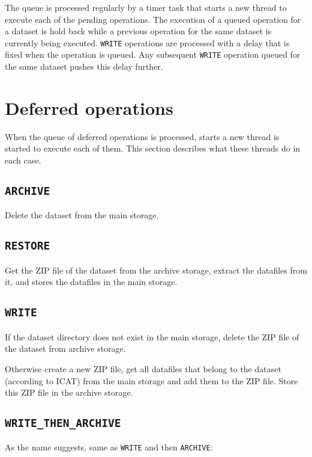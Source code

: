 \documentclass[paper=a4]{scrartcl}
\begin{document}
The queue is processed regularly by a timer task that starts a new
thread to execute each of the pending operations.  The execution of a
queued operation for a dataset is hold back while a previous operation
for the same dataset is currently being executed.  \texttt{WRITE}
operations are processed with a delay that is fixed when the operation
is queued.  Any subsequent \texttt{WRITE} operation queued for the
same dataset pushes this delay further.


\section{Deferred operations}
\label{sec:defops}

When the queue of deferred operations is processed, starts a new
thread is started to execute each of them.  This section describes
what these threads do in each case.

\subsection{\texttt{ARCHIVE}}

Delete the dataset from the main storage.

\subsection{\texttt{RESTORE}}

Get the ZIP file of the dataset from the archive storage, extract the
datafiles from it, and stores the datafiles in the main storage.

\subsection{\texttt{WRITE}}

If the dataset directory does not exist in the main storage, delete
the ZIP file of the dataset from archive storage.

Otherwise create a new ZIP file, get all datafiles that belong to the
dataset (according to ICAT) from the main storage and add them to the
ZIP file.  Store this ZIP file in the archive storage.

\subsection{\texttt{WRITE\_THEN\_ARCHIVE}}

As the name suggests, same as \texttt{WRITE} and then
\texttt{ARCHIVE}:
\end{document}
